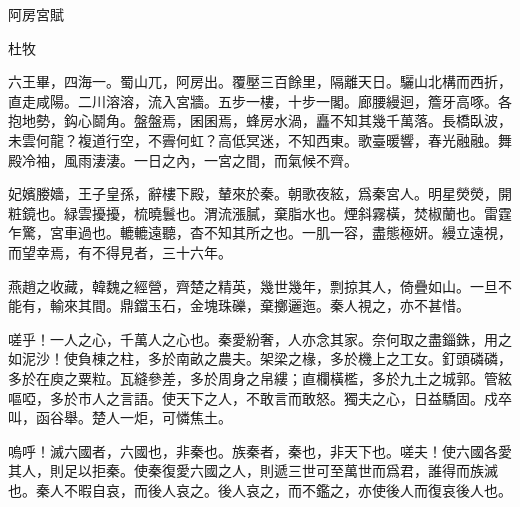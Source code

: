 阿房宮賦

杜牧

六王畢，四海一。蜀山兀，阿房出。覆壓三百餘里，隔離天日。驪山北構而西折，直走咸陽。二川溶溶，流入宮牆。五步一樓，十步一閣。廊腰縵迴，簷牙高啄。各抱地勢，鈎心鬬角。盤盤焉，囷囷焉，蜂房水渦，矗不知其幾千萬落。長橋臥波，未雲何龍？複道行空，不霽何虹？高低冥迷，不知西東。歌臺暖響，春光融融。舞殿冷袖，風雨淒淒。一日之內，一宮之間，而氣候不齊。

妃嬪媵嬙，王子皇孫，辭樓下殿，輦來於秦。朝歌夜絃，爲秦宮人。明星熒熒，開粧鏡也。緑雲擾擾，梳曉鬟也。渭流漲膩，棄脂水也。煙斜霧橫，焚椒蘭也。雷霆乍驚，宮車過也。轆轆遠聽，杳不知其所之也。一肌一容，盡態極妍。縵立遠視，而望幸焉，有不得見者，三十六年。

燕趙之收藏，韓魏之經營，齊楚之精英，幾世幾年，剽掠其人，倚疊如山。一旦不能有，輸來其間。鼎鐺玉石，金塊珠礫，棄擲邐迤。秦人視之，亦不甚惜。

嗟乎！一人之心，千萬人之心也。秦愛紛奢，人亦念其家。奈何取之盡錙銖，用之如泥沙！使負棟之柱，多於南畝之農夫。架梁之椽，多於機上之工女。釘頭磷磷，多於在庾之粟粒。瓦縫參差，多於周身之帛縷；直欄橫檻，多於九土之城郭。管絃嘔啞，多於市人之言語。使天下之人，不敢言而敢怒。獨夫之心，日益驕固。戍卒叫，函谷舉。楚人一炬，可憐焦土。

嗚呼！滅六國者，六國也，非秦也。族秦者，秦也，非天下也。嗟夫！使六國各愛其人，則足以拒秦。使秦復愛六國之人，則遞三世可至萬世而爲君，誰得而族滅也。秦人不暇自哀，而後人哀之。後人哀之，而不鑑之，亦使後人而復哀後人也。